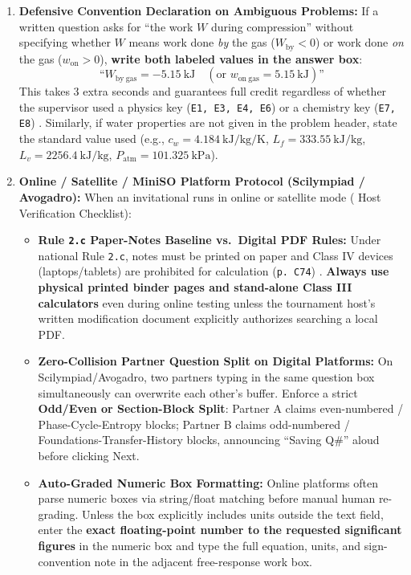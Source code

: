 \begin{enumerate}
  \item \textbf{Defensive Convention Declaration on Ambiguous Problems:}
  If a written question asks for ``the work $W$ during compression'' without specifying whether $W$ means work done \textit{by} the gas ($W_{\mathrm{by}} < 0$) or work done \textit{on} the gas ($w_{\mathrm{on}} > 0$), \textbf{write both labeled values in the answer box}:
  \[
    \text{``}W_{\mathrm{by\ gas}} = \SI{-5.15}{\kilo\joule} \quad (\text{or } w_{\mathrm{on\ gas}} = \SI{+5.15}{\kilo\joule})\text{''}
  \]
  This takes 3 extra seconds and guarantees full credit regardless of whether the supervisor used a physics key (\texttt{E1, E3, E4, E6}) or a chemistry key (\texttt{E7, E8}) . Similarly, if water properties are not given in the problem header, state the standard value used (e.g., $c_w = \SI{4.184}{\kilo\joule\per\kilogram\per\kelvin}$, $L_f = \SI{333.55}{\kilo\joule\per\kilogram}$, $L_v = \SI{2256.4}{\kilo\joule\per\kilogram}$, $P_{\mathrm{atm}} = \SI{101.325}{\kilo\pascal}$).
  \item \textbf{Online / Satellite / MiniSO Platform Protocol (Scilympiad / Avogadro):}
  When an invitational runs in online or satellite mode ( Host Verification Checklist):
  \begin{itemize}
    \item \textbf{Rule \texttt{2.c} Paper-Notes Baseline vs.\ Digital PDF Rules:} Under national Rule \texttt{2.c}, notes must be printed on paper and Class IV devices (laptops/tablets) are prohibited for calculation (\texttt{p.\ C74}) . \textbf{Always use physical printed binder pages and stand-alone Class III calculators} even during online testing unless the tournament host's written modification document explicitly authorizes searching a local PDF.
    \item \textbf{Zero-Collision Partner Question Split on Digital Platforms:} On Scilympiad/Avogadro, two partners typing in the same question box simultaneously can overwrite each other's buffer. Enforce a strict \textbf{Odd/Even or Section-Block Split}: Partner A claims even-numbered / Phase-Cycle-Entropy blocks; Partner B claims odd-numbered / Foundations-Transfer-History blocks, announcing ``Saving Q\#'' aloud before clicking Next.
    \item \textbf{Auto-Graded Numeric Box Formatting:} Online platforms often parse numeric boxes via string/float matching before manual human re-grading. Unless the box explicitly includes units outside the text field, enter the \textbf{exact floating-point number to the requested significant figures} in the numeric box and type the full equation, units, and sign-convention note in the adjacent free-response work box.
  \end{itemize}
\end{enumerate}


